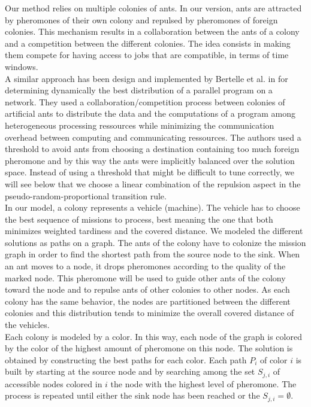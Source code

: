 \documentclass[a4paper,12pt]{article}
\begin{document}
Our method relies on multiple colonies of ants. In our version, ants are attracted by pheromones of their own colony and repulsed by pheromones of foreign colonies. This mechanism results in a collaboration between the ants of a colony and a competition between the different colonies. The idea consists in making them compete for having access to jobs that are compatible, in terms of time windows.\\

A similar approach has been design and implemented by Bertelle et al. in \cite{Bertelle2006,Bertelle2007} for determining dynamically the best distribution of a parallel program on a network. They used a collaboration/competition process between colonies of artificial ants to distribute the data and the computations of a program among heterogeneous processing ressources while minimizing the communication overhead between computing and communicating ressources. The authors used a threshold to avoid ants from choosing a destination containing too much foreign pheromone and by this way the ants were implicitly balanced over the solution space. Instead of using a threshold that might be difficult to tune correctly, we will see below that we choose a linear combination of the repulsion aspect in the pseudo-random-proportional transition rule.\\

In our model, a colony represents a vehicle (machine). The vehicle has to choose the best sequence of missions to process, best meaning the one that both minimizes weighted tardiness and the covered distance. We modeled the different solutions as paths on a graph. The ants of the colony have to colonize the mission graph in order to find the shortest path from the source node to the sink. When an ant moves to a node, it drops pheromones according to the quality of the marked node. This pheromone will be used to guide other ants of the colony toward the node and to repulse ants of other colonies to other nodes. As each colony has the same behavior, the nodes are partitioned between the different colonies and this distribution tends to minimize the overall covered distance of the vehicles.\\

Each colony is modeled by a color. In this way, each node of the graph is colored by the color of the highest amount of pheromone on this node. The solution is obtained by constructing the best paths for each color. Each path $P_i$ of color $i$ is built by starting at the source node and by searching among the set $S_{j,i}$ of accessible nodes colored in $i$ the node with the highest level of pheromone. The process is repeated until either the sink node has been reached or the $S_{j,i} = \emptyset$.
\end{document}
